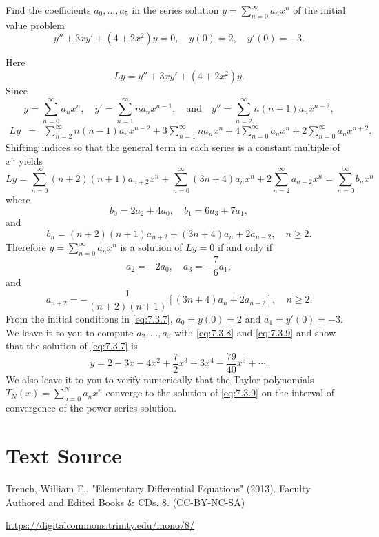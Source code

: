 \documentclass{ximera}
\begin{document}
\begin{example}\label{example:7.3.3}
Find the coefficients $a_0, \dots, a_5$ in the series
solution $y=\sum^\infty_{n=0}
a_nx^n$   of the initial value problem
\begin{equation} \label{eq:7.3.7}
y''+3xy'+(4+2x^2)y=0,\quad y(0)=2,\quad y'(0)=-3.
\end{equation}
\begin{explanation}
Here
$$
Ly=y''+3xy'+(4+2x^2)y.
$$
Since
$$
y=\sum^\infty_{n=0} a_nx^n,\quad y'=\sum^\infty_{n=1} n
a_nx^{n-1},\quad\mbox{and}\quad
y''=\sum^\infty_{n=2}n(n-1)a_nx^{n-2},
$$
\begin{eqnarray*}
Ly&=&\sum^\infty_{n=2}n(n-1)a_nx^{n-2}
+3\sum^\infty_{n=1}na_nx^n+4\sum^\infty_{n=0}a_nx^n+2\sum^\infty_{n=0}
a_nx^{n+2}.
\end{eqnarray*}
Shifting indices so  that the general term in each
series is a constant multiple of $x^n$ yields
$$
Ly=\sum^\infty_{n=0}(n+2)(n+1)a_{n+2}x^n+\sum^\infty_{n=0}(3n+4)a_nx^n
+2\sum^\infty_{n=2}a_{n-2}x^n=\sum_{n=0}^\infty b_nx^n
$$
where
$$
b_0=2a_2+4a_0,\quad b_1=6a_3+7a_1,
$$
and
$$
b_n=(n+2)(n+1)a_{n+2}+(3n+4)a_n+2a_{n-2},\quad n\geq2.
$$
Therefore $y=\sum^\infty_{n=0}a_nx^n$ is a solution of $Ly=0$
if and only if
\begin{equation} \label{eq:7.3.8}
a_2=-2a_0,\quad a_3=-\frac{7}{6}a_1,
\end{equation}
and
\begin{equation} \label{eq:7.3.9}
a_{n+2}=-\frac{1}{(n+2)(n+1)}\left[(3n+4)a_n+2a_{n-2}\right],\quad n\geq2.
\end{equation}
From the initial conditions in \eqref{eq:7.3.7}, $a_0=y(0)=2$ and
$a_1=y'(0)=-3$. We leave it to you to compute $a_2, \dots, a_5$ with
 \eqref{eq:7.3.8} and \eqref{eq:7.3.9} and show that the solution of
\eqref{eq:7.3.7} is
$$
y=2-3x-4x^2+\frac{7}{2}x^3+3x^4-\frac{79}{40}x^5+\cdots.
$$
We also leave it to you 
to verify numerically
that the Taylor polynomials $T_N(x)=\sum_{n=0}^Na_nx^n$ converge to
the solution of \eqref{eq:7.3.9} on the interval of
convergence of the power series solution.
\end{explanation}
\end{example}

\section*{Text Source}
Trench, William F., "Elementary Differential Equations" (2013). Faculty Authored and Edited Books \& CDs. 8. (CC-BY-NC-SA)

\href{https://digitalcommons.trinity.edu/mono/8/}{https://digitalcommons.trinity.edu/mono/8/}
\end{document}
